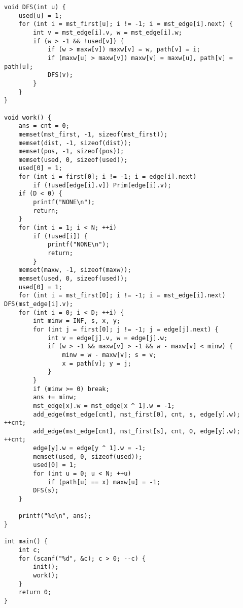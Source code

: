 \begin{verbatim}
void DFS(int u) {
    used[u] = 1;
    for (int i = mst_first[u]; i != -1; i = mst_edge[i].next) {
        int v = mst_edge[i].v, w = mst_edge[i].w;
        if (w > -1 && !used[v]) {
            if (w > maxw[v]) maxw[v] = w, path[v] = i;
            if (maxw[u] > maxw[v]) maxw[v] = maxw[u], path[v] = path[u];
            DFS(v);
        }
    }
}

void work() {
    ans = cnt = 0;
    memset(mst_first, -1, sizeof(mst_first));
    memset(dist, -1, sizeof(dist));
    memset(pos, -1, sizeof(pos));
    memset(used, 0, sizeof(used));
    used[0] = 1;
    for (int i = first[0]; i != -1; i = edge[i].next)
        if (!used[edge[i].v]) Prim(edge[i].v);
    if (D < 0) {
        printf("NONE\n");
        return;
    }
    for (int i = 1; i < N; ++i)
        if (!used[i]) {
            printf("NONE\n");
            return;
        }
    memset(maxw, -1, sizeof(maxw));
    memset(used, 0, sizeof(used));
    used[0] = 1;
    for (int i = mst_first[0]; i != -1; i = mst_edge[i].next) DFS(mst_edge[i].v);
    for (int i = 0; i < D; ++i) {
        int minw = INF, s, x, y;
        for (int j = first[0]; j != -1; j = edge[j].next) {
            int v = edge[j].v, w = edge[j].w;
            if (w > -1 && maxw[v] > -1 && w - maxw[v] < minw) {
                minw = w - maxw[v]; s = v;
                x = path[v]; y = j;
            }
        }
        if (minw >= 0) break;
        ans += minw;
        mst_edge[x].w = mst_edge[x ^ 1].w = -1;
        add_edge(mst_edge[cnt], mst_first[0], cnt, s, edge[y].w); ++cnt;
        add_edge(mst_edge[cnt], mst_first[s], cnt, 0, edge[y].w); ++cnt;
        edge[y].w = edge[y ^ 1].w = -1;
        memset(used, 0, sizeof(used));
        used[0] = 1;
        for (int u = 0; u < N; ++u)
            if (path[u] == x) maxw[u] = -1;
        DFS(s);
    }

    printf("%d\n", ans);
}

int main() {
    int c;
    for (scanf("%d", &c); c > 0; --c) {
        init();
        work();
    }
    return 0;
}
\end{verbatim}
